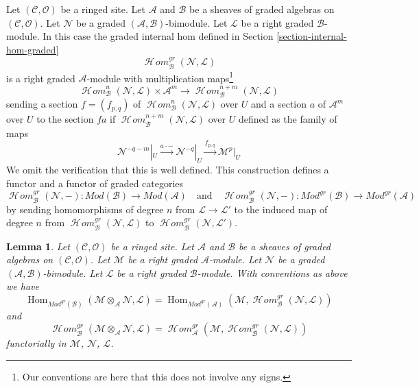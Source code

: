 \documentclass{stacks-project}
\theoremstyle{plain}
\newtheorem{lemma}[subsection]{Lemma}
\theoremstyle{definition}
\theoremstyle{remark}
\numberwithin{equation}{subsection}
\def\Hom{\mathop{\mathrm{Hom}}\nolimits}
\def\SheafHom{\mathop{\mathcal{H}\!\mathit{om}}\nolimits}
\begin{document}
\medskip\noindent
Let $(\mathcal{C}, \mathcal{O})$ be a ringed site. Let $\mathcal{A}$
and $\mathcal{B}$ be a sheaves of graded algebras on
$(\mathcal{C}, \mathcal{O})$. Let $\mathcal{N}$ be a
graded $(\mathcal{A}, \mathcal{B})$-bimodule. Let 
$\mathcal{L}$ be a right graded $\mathcal{B}$-module.
In this case the graded internal hom
defined in Section \ref{section-internal-hom-graded}
$$
\SheafHom_\mathcal{B}^{gr}(\mathcal{N}, \mathcal{L})
$$
is a right graded $\mathcal{A}$-module with
multiplication maps\footnote{Our conventions are here
that this does not involve any signs.}
$$
\SheafHom^n_\mathcal{B}(\mathcal{N}, \mathcal{L})
\times \mathcal{A}^m
\longrightarrow
\SheafHom^{n + m}_\mathcal{B}(\mathcal{N}, \mathcal{L})
$$
sending a section $f = (f_{p,q})$ of
$\SheafHom^n_\mathcal{B}(\mathcal{N}, \mathcal{L})$ over $U$
and a section $a$ of $\mathcal{A}^m$ over $U$ to the section
$f a$ if $\SheafHom^{n + m}_\mathcal{B}(\mathcal{N}, \mathcal{L})$ over $U$
defined as the family of maps
$$
\mathcal{N}^{-q - m}|_U \xrightarrow{a \cdot -}
\mathcal{N}^{-q}|_U \xrightarrow{f_{p, q}}
\mathcal{M}^p|_U
$$
We omit the verification that this is well defined. This construction
defines a functor and a functor of graded categories
$$
\SheafHom_\mathcal{B}^{gr}(\mathcal{N}, -) :
\textit{Mod}(\mathcal{B})
\longrightarrow
\textit{Mod}(\mathcal{A})
\quad\text{and}\quad
\SheafHom_\mathcal{B}^{gr}(\mathcal{N}, -) :
\textit{Mod}^{gr}(\mathcal{B})
\longrightarrow
\textit{Mod}^{gr}(\mathcal{A})
$$
by sending homomorphisms of degree $n$ from $\mathcal{L} \to \mathcal{L}'$
to the induced map of degree $n$ from
$\SheafHom_\mathcal{B}^{gr}(\mathcal{N}, \mathcal{L})$ to
$\SheafHom_\mathcal{B}^{gr}(\mathcal{N}, \mathcal{L}')$.

\begin{lemma}
\label{lemma-tensor-hom-adjunction-gr}
Let $(\mathcal{C}, \mathcal{O})$ be a ringed site. Let $\mathcal{A}$
and $\mathcal{B}$ be a sheaves of graded algebras on
$(\mathcal{C}, \mathcal{O})$. Let $\mathcal{M}$ be a right
graded $\mathcal{A}$-module. Let $\mathcal{N}$ be a
graded $(\mathcal{A}, \mathcal{B})$-bimodule. Let $\mathcal{L}$
be a right graded $\mathcal{B}$-module. With conventions as above
we have
$$
\Hom_{\textit{Mod}^{gr}(\mathcal{B})}(
\mathcal{M} \otimes_\mathcal{A} \mathcal{N}, \mathcal{L}) =
\Hom_{\textit{Mod}^{gr}(\mathcal{A})}(
\mathcal{M}, \SheafHom_\mathcal{B}^{gr}(\mathcal{N}, \mathcal{L}))
$$
and
$$
\SheafHom_\mathcal{B}^{gr}(
\mathcal{M} \otimes_\mathcal{A} \mathcal{N}, \mathcal{L}) =
\SheafHom_\mathcal{A}^{gr}(
\mathcal{M}, \SheafHom_\mathcal{B}^{gr}(\mathcal{N}, \mathcal{L}))
$$
functorially in $\mathcal{M}$, $\mathcal{N}$, $\mathcal{L}$.
\end{lemma}
\end{document}

